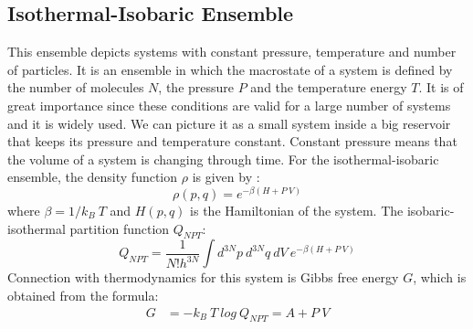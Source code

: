  \subsection{Isothermal-Isobaric  Ensemble} 
 This ensemble depicts systems with constant pressure, temperature and number of particles. It is an ensemble in which  the macrostate of a system is defined by the number of molecules $N$, the pressure $P$ and the temperature energy $T$. It is of great importance since these conditions are valid for a large number of systems and it is widely used. We can picture it as a small system inside a big reservoir that keeps its pressure and temperature constant. Constant pressure means that the volume of a system is changing through time. For the isothermal-isobaric ensemble, the density function $\rho $ is given by \citep{Allen1989}: 
 \begin{equation}
 \rho (p, q) = e^{-\beta(H + P~V)} 
 \end{equation} 
 where $\beta = 1/k_B~T$ and $H(p, q)$ is the Hamiltonian of the system. The isobaric-isothermal   partition function $Q_{NPT}$:
 \begin{equation}
 Q_{NPT} = \frac {1}{N! h^{3N}} \int d^{3N}p~ d^{3N}q ~dV ~ e^{-\beta(H + P~V)}  
 \end{equation} 
 Connection with thermodynamics for this system is Gibbs free energy $G$, which is obtained from the formula: 
 \begin{align}
 G & = - k_B~T~log~Q_{NPT} = A + P~V
 \end{align} 
 
